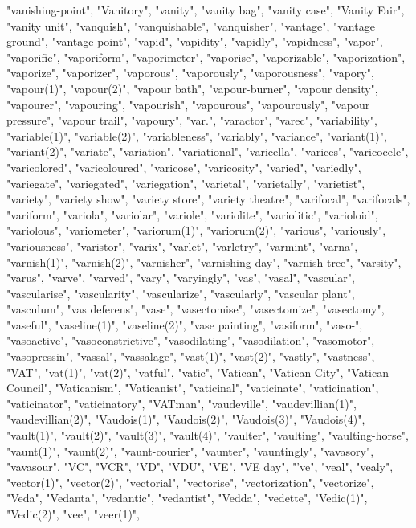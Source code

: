 "vanishing-point",
"Vanitory",
"vanity",
"vanity bag",
"vanity case",
"Vanity Fair",
"vanity unit",
"vanquish",
"vanquishable",
"vanquisher",
"vantage",
"vantage ground",
"vantage point",
"vapid",
"vapidity",
"vapidly",
"vapidness",
"vapor",
"vaporific",
"vaporiform",
"vaporimeter",
"vaporise",
"vaporizable",
"vaporization",
"vaporize",
"vaporizer",
"vaporous",
"vaporously",
"vaporousness",
"vapory",
"vapour(1)",
"vapour(2)",
"vapour bath",
"vapour-burner",
"vapour density",
"vapourer",
"vapouring",
"vapourish",
"vapourous",
"vapourously",
"vapour pressure",
"vapour trail",
"vapoury",
"var.",
"varactor",
"varec",
"variability",
"variable(1)",
"variable(2)",
"variableness",
"variably",
"variance",
"variant(1)",
"variant(2)",
"variate",
"variation",
"variational",
"varicella",
"varices",
"varicocele",
"varicolored",
"varicoloured",
"varicose",
"varicosity",
"varied",
"variedly",
"variegate",
"variegated",
"variegation",
"varietal",
"varietally",
"varietist",
"variety",
"variety show",
"variety store",
"variety theatre",
"varifocal",
"varifocals",
"variform",
"variola",
"variolar",
"variole",
"variolite",
"variolitic",
"varioloid",
"variolous",
"variometer",
"variorum(1)",
"variorum(2)",
"various",
"variously",
"variousness",
"varistor",
"varix",
"varlet",
"varletry",
"varmint",
"varna",
"varnish(1)",
"varnish(2)",
"varnisher",
"varnishing-day",
"varnish tree",
"varsity",
"varus",
"varve",
"varved",
"vary",
"varyingly",
"vas",
"vasal",
"vascular",
"vascularise",
"vascularity",
"vascularize",
"vascularly",
"vascular plant",
"vasculum",
"vas deferens",
"vase",
"vasectomise",
"vasectomize",
"vasectomy",
"vaseful",
"vaseline(1)",
"vaseline(2)",
"vase painting",
"vasiform",
"vaso-",
"vasoactive",
"vasoconstrictive",
"vasodilating",
"vasodilation",
"vasomotor",
"vasopressin",
"vassal",
"vassalage",
"vast(1)",
"vast(2)",
"vastly",
"vastness",
"VAT",
"vat(1)",
"vat(2)",
"vatful",
"vatic",
"Vatican",
"Vatican City",
"Vatican Council",
"Vaticanism",
"Vaticanist",
"vaticinal",
"vaticinate",
"vaticination",
"vaticinator",
"vaticinatory",
"VATman",
"vaudeville",
"vaudevillian(1)",
"vaudevillian(2)",
"Vaudois(1)",
"Vaudois(2)",
"Vaudois(3)",
"Vaudois(4)",
"vault(1)",
"vault(2)",
"vault(3)",
"vault(4)",
"vaulter",
"vaulting",
"vaulting-horse",
"vaunt(1)",
"vaunt(2)",
"vaunt-courier",
"vaunter",
"vauntingly",
"vavasory",
"vavasour",
"VC",
"VCR",
"VD",
"VDU",
"VE",
"VE day",
"'ve",
"veal",
"vealy",
"vector(1)",
"vector(2)",
"vectorial",
"vectorise",
"vectorization",
"vectorize",
"Veda",
"Vedanta",
"vedantic",
"vedantist",
"Vedda",
"vedette",
"Vedic(1)",
"Vedic(2)",
"vee",
"veer(1)",
